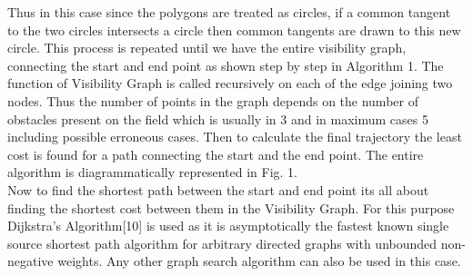 \documentclass[letterpaper, 10 pt, conference]{ieeeconf}  %
\begin{document}
Thus in this case since the polygons are treated as circles, if a common tangent to the two circles intersects a circle then common tangents are drawn to this new circle. This process is repeated until we have the entire visibility graph, connecting the start and end point as shown step by step in Algorithm 1. The function of Visibility Graph is called recursively on each of the edge joining two nodes. Thus the number of points in the graph depends on the number of obstacles present on the field which is usually in 3 and in maximum cases 5 including possible erroneous cases. Then to calculate the final trajectory the least cost is found for a path connecting the start and the end point. The entire algorithm is diagrammatically represented in Fig. 1.\\
Now to find the shortest path between the start and end point its all about finding the shortest cost between them in the Visibility Graph. For this purpose Dijkstra's Algorithm[10] is used as it is asymptotically the fastest known single source shortest path algorithm for arbitrary directed graphs with unbounded non-negative weights. Any other graph search algorithm can also be used in this case. 
\end{document}
